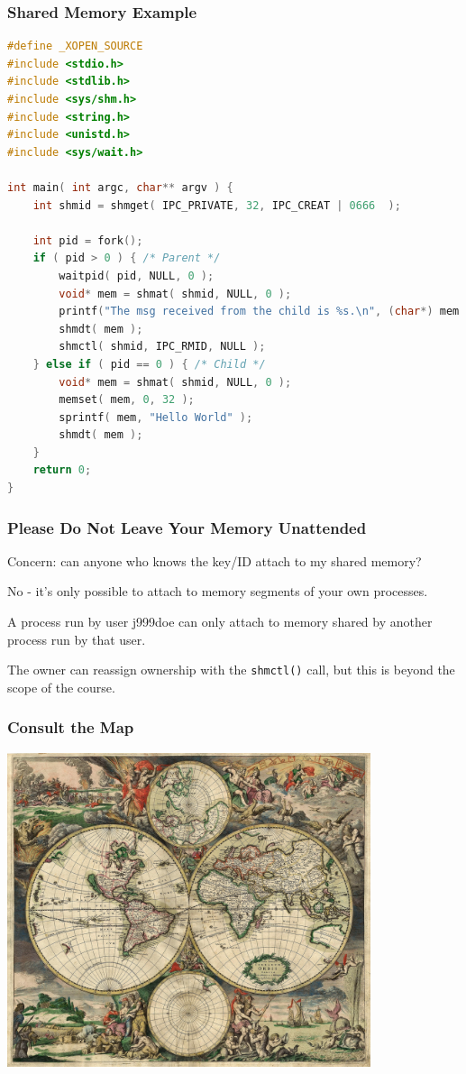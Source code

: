 \begin{frame}[fragile]
	\frametitle{Shared Memory Example}
	\begin{lstlisting}[language=C]
#define _XOPEN_SOURCE
#include <stdio.h>
#include <stdlib.h>
#include <sys/shm.h>
#include <string.h>
#include <unistd.h>
#include <sys/wait.h>

int main( int argc, char** argv ) { 
    int shmid = shmget( IPC_PRIVATE, 32, IPC_CREAT | 0666  );  

    int pid = fork();
    if ( pid > 0 ) { /* Parent */
        waitpid( pid, NULL, 0 );
        void* mem = shmat( shmid, NULL, 0 );
        printf("The msg received from the child is %s.\n", (char*) mem );
        shmdt( mem );
        shmctl( shmid, IPC_RMID, NULL );
    } else if ( pid == 0 ) { /* Child */
        void* mem = shmat( shmid, NULL, 0 );
        memset( mem, 0, 32 );
        sprintf( mem, "Hello World" );
        shmdt( mem );
    }   
    return 0;
}
\end{lstlisting}

\end{frame}

\begin{frame}
	\frametitle{Please Do Not Leave Your Memory Unattended}
	
	Concern: can anyone who knows the key/ID attach to my shared memory?
	
    No - it's only possible to attach to memory segments of your own processes. 
	
    A process run by user j999doe can only attach to memory shared by another process run by that user.

	
    The owner can reassign ownership with the \texttt{shmctl()} call, but this is beyond the scope of the course.
	
\end{frame}

\begin{frame}
	\frametitle{Consult the Map}

	\begin{center}
		\includegraphics[width=0.8\textwidth]{images/worldmap.jpg}
	\end{center}


\end{frame}


